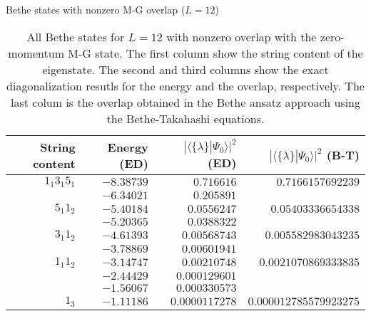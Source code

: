 \documentclass[12pt,a4paper,final]{iopart}
\begin{document}
\begin{table}[h]
\scriptsize
\centering
Bethe states with nonzero M-G overlap ($L=12$)\\[1ex]
\begin{tabular}{rrrr}
String content & Energy (ED) & $|\langle \{\lambda\}| \Psi_0 \rangle|^2$ (ED) & $|\langle \{\lambda\}| \Psi_0 \rangle|^2$ (B-T) \\[0.3em]
\toprule
$1_1 3_1 5_1$ & $-8.38739$  & $0.716616$     &  $0.7166157692239$\\
              & $-6.34021$  & $0.205891$     &  \\
$5_1 1_2$     & $-5.40184$  & $0.0556247$    & $0.05403336654338$\\
              & $-5.20365$  & $0.0388322$    & \\
$3_1 1_2$     & $-4.61393$  & $0.00568743$   & $0.005582983043235$\\
              & $-3.78869$  & $0.00601941$   & \\
$1_1 1_2$     & $-3.14747$  & $0.00210748$   & $0.0021070869333835$\\
              & $-2.44429$  & $0.000129601$  & \\
              & $-1.56067$  & $0.000330573$  & \\
$1_3$         & $-1.11186$  & $0.0000117278$ & $0.000012785579923275$\\
\bottomrule
\end{tabular}
\caption{All Bethe states for $L=12$ with nonzero overlap with the zero-momentum 
 M-G state. The first column show the string content of the eigenstate. The second 
 and third columns show the exact diagonalization resutls for the energy and the 
 overlap, respectively. The last colum is the overlap obtained in the Bethe ansatz 
 approach using the Bethe-Takahashi equations.
}
\label{table:RV:sumruleN12}
\end{table}
\end{document}
